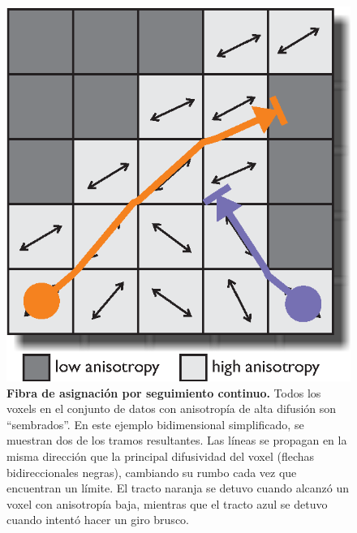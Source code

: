 \documentclass[12pt,a5,twoside]{book}
\begin{document}
\begin{figure}
	\centering
    \includegraphics [scale=1,center] {DTI_FACT.eps}
    \caption{\textbf{Fibra de asignación por seguimiento continuo.} Todos los voxels en el conjunto de datos con anisotropía de alta difusión son ``sembrados''. En este ejemplo bidimensional simplificado, se muestran dos de los tramos resultantes. Las líneas se propagan en la misma dirección que la principal difusividad del voxel (flechas bidireccionales negras), cambiando su rumbo cada vez que encuentran un límite. El tracto naranja se detuvo cuando alcanzó un voxel con anisotropía baja, mientras que el tracto azul se detuvo cuando intentó hacer un giro brusco.}
    \label{F:DTI_FACT}
\end{figure}
\end{document}
